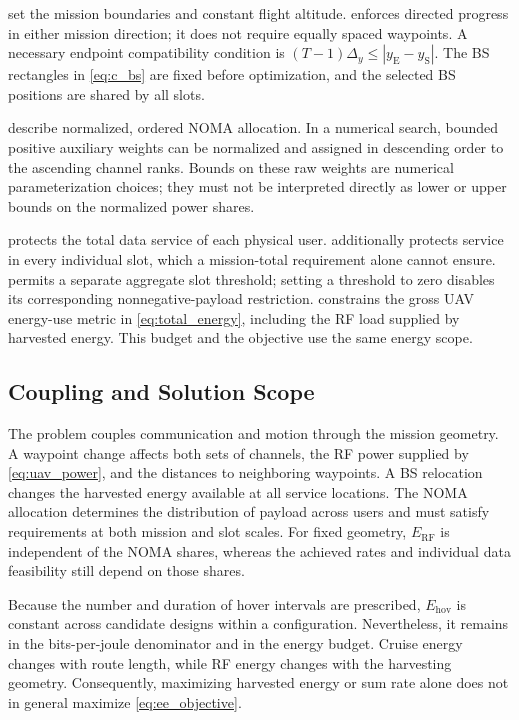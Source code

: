 \documentclass[conference]{IEEEtran}
\newcommand{\RF}{\mathrm{RF}}
\newcommand{\hov}{\mathrm{hov}}
\begin{document}
 set the mission boundaries and constant flight altitude.  enforces directed progress in either mission direction; it does not require equally spaced waypoints. A necessary endpoint compatibility condition is $(T-1)\Delta_y\le|y_{\mathrm E}-y_{\mathrm S}|$. The BS rectangles in \cref{eq:c_bs} are fixed before optimization, and the selected BS positions are shared by all slots.

 describe normalized, ordered NOMA allocation. In a numerical search, bounded positive auxiliary weights can be normalized and assigned in descending order to the ascending channel ranks. Bounds on these raw weights are numerical parameterization choices; they must not be interpreted directly as lower or upper bounds on the normalized power shares.

 protects the total data service of each physical user.  additionally protects service in every individual slot, which a mission-total requirement alone cannot ensure.  permits a separate aggregate slot threshold; setting a threshold to zero disables its corresponding nonnegative-payload restriction.  constrains the gross UAV energy-use metric in \cref{eq:total_energy}, including the RF load supplied by harvested energy. This budget and the objective use the same energy scope.

\subsection{Coupling and Solution Scope}
The problem couples communication and motion through the mission geometry. A waypoint change affects both sets of channels, the RF power supplied by \cref{eq:uav_power}, and the distances to neighboring waypoints. A BS relocation changes the harvested energy available at all service locations. The NOMA allocation determines the distribution of payload across users and must satisfy requirements at both mission and slot scales. For fixed geometry, $E_{\RF}$ is independent of the NOMA shares, whereas the achieved rates and individual data feasibility still depend on those shares.

Because the number and duration of hover intervals are prescribed, $E_{\hov}$ is constant across candidate designs within a configuration. Nevertheless, it remains in the bits-per-joule denominator and in the energy budget. Cruise energy changes with route length, while RF energy changes with the harvesting geometry. Consequently, maximizing harvested energy or sum rate alone does not in general maximize \cref{eq:ee_objective}.
\end{document}
